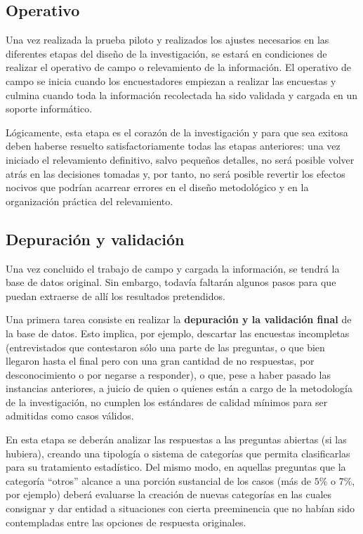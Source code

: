 \documentclass[
]{book}
\begin{document}
\hypertarget{operativo}{%
\subsection{Operativo}\label{operativo}}

Una vez realizada la prueba piloto y realizados los ajustes necesarios en las diferentes etapas del diseño de la investigación, se estará en condiciones de realizar el operativo de campo o relevamiento de la información. El operativo de campo se inicia cuando los encuestadores empiezan a realizar las encuestas y culmina cuando toda la información recolectada ha sido validada y cargada en un soporte informático.

Lógicamente, esta etapa es el corazón de la investigación y para que sea exitosa deben haberse resuelto satisfactoriamente todas las etapas anteriores: una vez iniciado el relevamiento definitivo, salvo pequeños detalles, no será posible volver atrás en las decisiones tomadas y, por tanto, no será posible revertir los efectos nocivos que podrían acarrear errores en el diseño metodológico y en la organización práctica del relevamiento.

\hypertarget{depuraciuxf3n-y-validaciuxf3n}{%
\subsection{Depuración y validación}\label{depuraciuxf3n-y-validaciuxf3n}}

Una vez concluido el trabajo de campo y cargada la información, se tendrá la base de datos original. Sin embargo, todavía faltarán algunos pasos para que puedan extraerse de allí los resultados pretendidos.

Una primera tarea consiste en realizar la \textbf{depuración y la validación final} de la base de datos. Esto implica, por ejemplo, descartar las encuestas incompletas (entrevistados que contestaron sólo una parte de las preguntas, o que bien llegaron hasta el final pero con una gran cantidad de no respuestas, por desconocimiento o por negarse a responder), o que, pese a haber pasado las instancias anteriores, a juicio de quien o quienes están a cargo de la metodología de la investigación, no cumplen los estándares de calidad mínimos para ser admitidas como casos válidos.

En esta etapa se deberán analizar las respuestas a las preguntas abiertas (si las hubiera), creando una tipología o sistema de categorías que permita clasificarlas para su tratamiento estadístico. Del mismo modo, en aquellas preguntas que la categoría ``otros'' alcance a una porción sustancial de los casos (más de \(5\%\) o \(7\%\), por ejemplo) deberá evaluarse la creación de nuevas categorías en las cuales consignar y dar entidad a situaciones con cierta preeminencia que no habían sido contempladas entre las opciones de respuesta originales.
\end{document}
